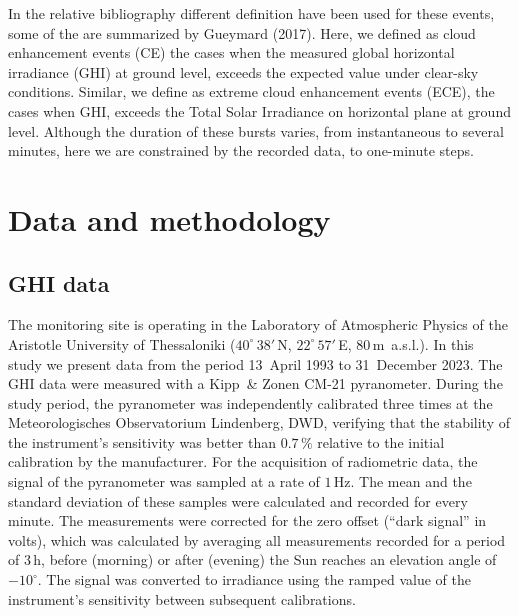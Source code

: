 \documentclass[
  preprint, 3p, authoryear]{article}
\begin{document}
In the relative bibliography different definition have been used for these events,
some of the are summarized by Gueymard (2017). Here, we defined as cloud enhancement
events (CE) the cases when the measured global horizontal irradiance (GHI) at ground
level, exceeds the expected value under clear-sky conditions. Similar, we define as
extreme cloud enhancement events (ECE), the cases when GHI, exceeds the Total Solar
Irradiance on horizontal plane at ground level. Although the duration of these
bursts varies, from instantaneous to several minutes, here we are constrained by the
recorded data, to one-minute steps.

\hypertarget{data-and-methodology}{%
\section{Data and methodology}\label{data-and-methodology}}

\hypertarget{ghi-data}{%
\subsection{GHI data}\label{ghi-data}}

The monitoring site is operating in the Laboratory of Atmospheric Physics of the
Aristotle University of Thessaloniki (\(40^\circ\,38'\,\)N,
\(22^\circ\,57'\,\)E, \(80\,\)m~a.s.l.).
In this study we present data from the period
13~April 1993 to
31~December 2023.
The GHI data were measured with a Kipp~\& Zonen CM-21 pyranometer. During the study
period, the pyranometer was independently calibrated three times at the
Meteorologisches Observatorium Lindenberg, DWD, verifying that the stability of the
instrument's sensitivity was better than \(0.7\,\%\) relative to the initial
calibration by the manufacturer.
For the acquisition of radiometric data, the signal of the pyranometer was sampled at
a rate of \(1\,\text{Hz}\). The mean and the standard deviation of these samples were
calculated and recorded for every minute. The measurements were corrected for the
zero offset (``dark signal'' in volts), which was calculated by averaging all
measurements recorded for a period of \(3\,\text{h}\), before (morning) or after
(evening) the Sun reaches an elevation angle of \(-10^\circ\). The signal was
converted to irradiance using the ramped value of the instrument's sensitivity
between subsequent calibrations.
\end{document}
